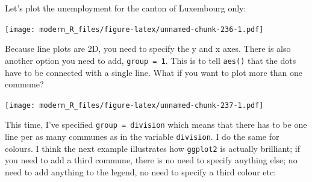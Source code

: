 \documentclass[]{gitbook}
\newenvironment{Shaded}{\begin{snugshade}}{\end{snugshade}}
\newcommand{\DataTypeTok}[1]{\textcolor[rgb]{0.13,0.29,0.53}{#1}}
\newcommand{\DecValTok}[1]{\textcolor[rgb]{0.00,0.00,0.81}{#1}}
\newcommand{\KeywordTok}[1]{\textcolor[rgb]{0.13,0.29,0.53}{\textbf{#1}}}
\newcommand{\NormalTok}[1]{#1}
\newcommand{\OperatorTok}[1]{\textcolor[rgb]{0.81,0.36,0.00}{\textbf{#1}}}
\newcommand{\StringTok}[1]{\textcolor[rgb]{0.31,0.60,0.02}{#1}}
\theoremstyle{definition}
\theoremstyle{definition}
\theoremstyle{definition}
\theoremstyle{remark}
\begin{document}
Let's plot the unemployment for the canton of Luxembourg only:

\begin{Shaded}
\end{Shaded}

\texttt{[image: modern\_R\_files/figure-latex/unnamed-chunk-236-1.pdf]}

Because line plots are 2D, you need to specify the y and x axes. There
is also another option you need to add, \texttt{group\ =\ 1}. This is to
tell \texttt{aes()} that the dots have to be connected with a single
line. What if you want to plot more than one commune?

\begin{Shaded}
\end{Shaded}

\texttt{[image: modern\_R\_files/figure-latex/unnamed-chunk-237-1.pdf]}

This time, I've specified \texttt{group\ =\ division} which means that
there has to be one line per as many communes as in the variable
\texttt{division}. I do the same for colours. I think the next example
illustrates how \texttt{ggplot2} is actually brilliant; if you need to
add a third commune, there is no need to specify anything else; no need
to add anything to the legend, no need to specify a third colour etc:
\end{document}
